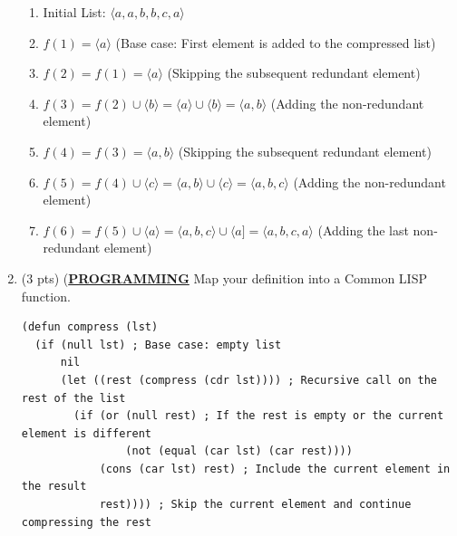 \documentclass[12pt]{article}
\begin{document}
\begin{spacing}{1.5}
\begin{enumerate}
        \begin{enumerate}
            \item Initial List: $\langle a, a, b, b, c, a \rangle$

            \item $f(1) = \langle a \rangle$ (Base case: First element is added to the compressed list)

            \item $f(2) = f(1) = \langle a \rangle$ (Skipping the subsequent redundant element)

            \item $f(3) = f(2) \cup \langle b \rangle = \langle a \rangle \cup \langle b \rangle = \langle a, b \rangle$ (Adding the non-redundant element)

            \item $f(4) = f(3) = \langle a, b \rangle$ (Skipping the subsequent redundant element)

            \item $f(5) = f(4) \cup \langle c \rangle = \langle a, b \rangle \cup \langle c \rangle = \langle a, b, c \rangle$ (Adding the non-redundant element)

            \item $f(6) = f(5) \cup \langle a \rangle = \langle a, b, c \rangle \cup \langle a] = \langle a, b, c, a \rangle$ (Adding the last non-redundant element)
        \end{enumerate}

        \item (3 pts) (\uline{\textbf{PROGRAMMING}} Map your definition into a Common LISP function.\\

        \begin{lstlisting}
(defun compress (lst)
  (if (null lst) ; Base case: empty list
      nil
      (let ((rest (compress (cdr lst)))) ; Recursive call on the rest of the list
        (if (or (null rest) ; If the rest is empty or the current element is different
                (not (equal (car lst) (car rest))))
            (cons (car lst) rest) ; Include the current element in the result
            rest)))) ; Skip the current element and continue compressing the rest
        \end{lstlisting}
        
    \end{enumerate}
\end{spacing}
\end{document}

